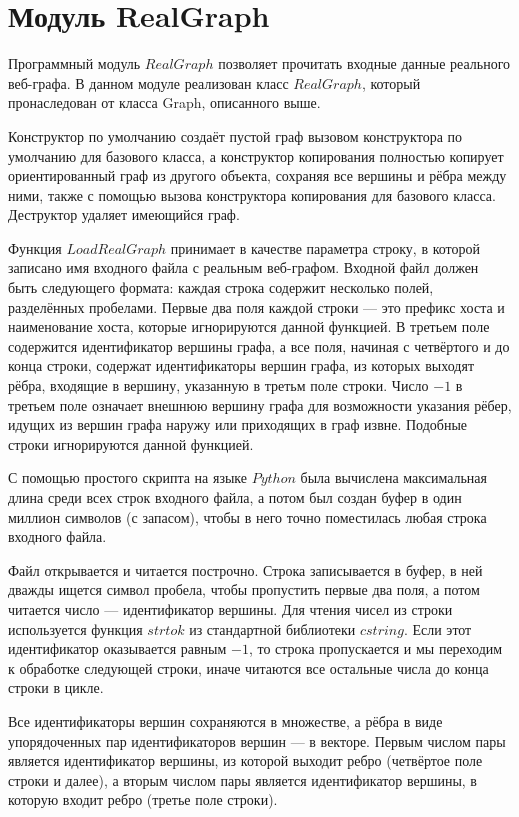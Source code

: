 \documentclass[14pt]{extreport}
\begin{document}
\section{Модуль RealGraph}

Программный модуль $RealGraph$ позволяет прочитать входные данные реального веб-графа. В данном модуле реализован класс $RealGraph$, который пронаследован от класса Graph, описанного выше.

Конструктор по умолчанию создаёт пустой граф вызовом конструктора по умолчанию для базового класса, а конструктор копирования полностью копирует ориентированный граф из другого объекта, сохраняя все вершины и рёбра между ними, также с помощью вызова конструктора копирования для базового класса. Деструктор удаляет имеющийся граф.

Функция $LoadRealGraph$ принимает в качестве параметра строку, в которой записано имя входного файла с реальным веб-графом. Входной файл должен быть следующего формата: каждая строка содержит несколько полей, разделённых пробелами. Первые два поля каждой строки --- это префикс хоста и наименование хоста, которые игнорируются данной функцией. В третьем поле содержится идентификатор вершины графа, а все поля, начиная с четвёртого и до конца строки, содержат идентификаторы вершин графа, из которых выходят рёбра, входящие в вершину, указанную в третьм поле строки. Число $-1$ в третьем поле означает внешнюю вершину графа для возможности указания рёбер, идущих из вершин графа наружу или приходящих в граф извне. Подобные строки игнорируются данной функцией.

С помощью простого скрипта на языке $Python$ была вычислена максимальная длина среди всех строк входного файла, а потом был создан буфер в один миллион символов (с запасом), чтобы в него точно поместилась любая строка входного файла.

Файл открывается и читается построчно. Строка записывается в буфер, в ней дважды ищется символ пробела, чтобы пропустить первые два поля, а потом читается число --- идентификатор вершины. Для чтения чисел из строки используется функция $strtok$ из стандартной библиотеки $cstring$. Если этот идентификатор оказывается равным $-1$, то строка пропускается и мы переходим к обработке следующей строки, иначе читаются все остальные числа до конца строки в цикле.

Все идентификаторы вершин сохраняются в множестве, а рёбра в виде упорядоченных пар идентификаторов вершин --- в векторе. Первым числом пары является идентификатор вершины, из которой выходит ребро (четвёртое поле строки и далее), а вторым числом пары является идентификатор вершины, в которую входит ребро (третье поле строки).
\end{document}
